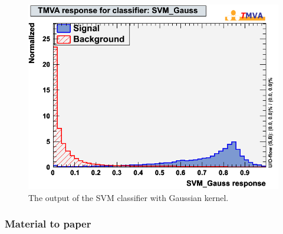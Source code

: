 \begin{figure}[h]
  \begin{center}
    \includegraphics[width=.3\textwidth]{images/mk_svm_gauss}
  \end{center}
  \caption{The output of the SVM classifier with Gaussian kernel.}
  \label{fig:mkSvmGauss}
\end{figure}

\subsubsection{Material to paper}


